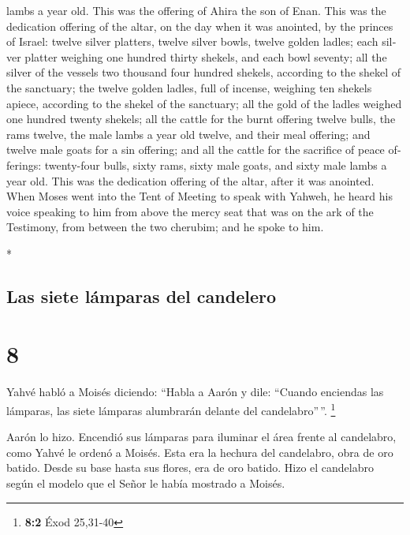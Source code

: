 \begin{paracol}{2}
\begin{otherlanguage}{english}
lambs a year old. This was the offering of Ahira the son of Enan.
 This was the dedication offering of the altar, on the
day when it was anointed, by the princes of Israel: twelve silver
platters, twelve silver bowls, twelve golden ladles; 
each silver platter weighing one hundred thirty shekels, and each bowl
seventy; all the silver of the vessels two thousand four hundred
shekels, according to the shekel of the sanctuary;  the
twelve golden ladles, full of incense, weighing ten shekels apiece,
according to the shekel of the sanctuary; all the gold of the ladles
weighed one hundred twenty shekels;  all the cattle for
the burnt offering twelve bulls, the rams twelve, the male lambs a year
old twelve, and their meal offering; and twelve male goats for a sin
offering;  and all the cattle for the sacrifice of peace
offerings: twenty-four bulls, sixty rams, sixty male goats, and sixty
male lambs a year old. This was the dedication offering of the altar,
after it was anointed.  When Moses went into the Tent of
Meeting to speak with Yahweh, he heard his voice speaking to him from
above the mercy seat that was on the ark of the Testimony, from between
the two cherubim; and he spoke to him.

\end{otherlanguage}

\switchcolumn[0]*

\hypertarget{las-siete-luxe1mparas-del-candelero}{%
\subsection{Las siete lámparas del
candelero}\label{las-siete-luxe1mparas-del-candelero}}

\hypertarget{section-14}{%
\section{8}\label{section-14}}

 Yahvé habló a Moisés diciendo:  ``Habla a
Aarón y dile: ``Cuando enciendas las lámparas, las siete lámparas
alumbrarán delante del candelabro''\,''. \footnote{\textbf{8:2} Éxod
  25,31-40}

 Aarón lo hizo. Encendió sus lámparas para iluminar el
área frente al candelabro, como Yahvé le ordenó a Moisés. 
Esta era la hechura del candelabro, obra de oro batido. Desde su base
hasta sus flores, era de oro batido. Hizo el candelabro según el modelo
que el Señor le había mostrado a Moisés.


\end{paracol}
